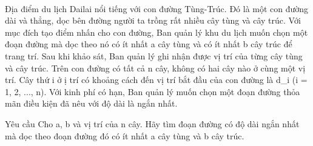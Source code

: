  

Địa điểm du lịch Dailai nổi tiếng với con đường Tùng-Trúc. Đó là một con đường dài và thẳng, dọc bên đường người ta trồng rất nhiều cây tùng và cây trúc. Với mục đích tạo điểm nhấn cho con đường, Ban quản lý khu du lịch muốn chọn một đoạn đường mà dọc theo nó có ít nhất a cây tùng và có ít nhất b cây trúc để trang trí. Sau khi khảo sát, Ban quản lý ghi nhận được vị trí của từng cây tùng và cây trúc. Trên con đường có tất cả n cây, không có hai cây nào ở cùng một vị trí. Cây thứ i ở ị trí có khoảng cách đến vị trí bắt đầu của con đường là d\_i (i = 1, 2, ..., n). Với kinh phí có hạn, Ban quản lý muốn chọn một đoạn đường thỏa mãn điều kiện đã nêu với độ dài là ngắn nhất.

Yêu cầu
Cho a, b và vị trí của n cây. Hãy tìm đoạn đường có độ dài ngắn nhất mà dọc theo đoạn đường đó có ít nhất a cây tùng và b cây trúc.